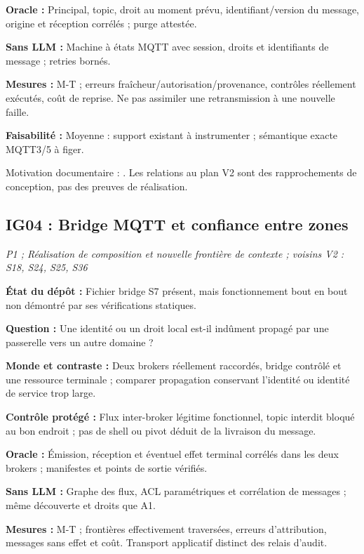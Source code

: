 \documentclass[11pt,a4paper]{article}
\begin{document}
\textbf{Oracle :} Principal, topic, droit au moment prévu, identifiant/version du message, origine et réception corrélés ; purge attestée.

\textbf{Sans LLM :} Machine à états MQTT avec session, droits et identifiants de message ; retries bornés.

\textbf{Mesures :} M-T ; erreurs fraîcheur/autorisation/provenance, contrôles réellement exécutés, coût de reprise. Ne pas assimiler une retransmission à une nouvelle faille.

\textbf{Faisabilité :} Moyenne : support existant à instrumenter ; sémantique exacte MQTT3/5 à figer.

Motivation documentaire : \cite{mqtt,mosquitto}. Les relations au plan V2 sont des rapprochements de conception, pas des preuves de réalisation.

\begin{samepage}\subsection{IG04 : Bridge MQTT et confiance entre zones}
\textit{P1 ; Réalisation de composition et nouvelle frontière de contexte ; voisins V2 : S18, S24, S25, S36}

\textbf{État du dépôt :} Fichier bridge S7 présent, mais fonctionnement bout en bout non démontré par ses vérifications statiques.
\par\end{samepage}
\textbf{Question :} Une identité ou un droit local est-il indûment propagé par une passerelle vers un autre domaine ?

\textbf{Monde et contraste :} Deux brokers réellement raccordés, bridge contrôlé et une ressource terminale ; comparer propagation conservant l'identité ou identité de service trop large.

\textbf{Contrôle protégé :} Flux inter-broker légitime fonctionnel, topic interdit bloqué au bon endroit ; pas de shell ou pivot déduit de la livraison du message.

\textbf{Oracle :} Émission, réception et éventuel effet terminal corrélés dans les deux brokers ; manifestes et points de sortie vérifiés.

\textbf{Sans LLM :} Graphe des flux, ACL paramétriques et corrélation de messages ; même découverte et droits que A1.

\textbf{Mesures :} M-T ; frontières effectivement traversées, erreurs d'attribution, messages sans effet et coût. Transport applicatif distinct des relais d'audit.
\end{document}
